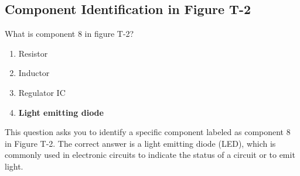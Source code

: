 \subsection{Component Identification in Figure T-2}
\label{T6C07}

\begin{tcolorbox}[colback=gray!10!white,colframe=black!75!black,title=T6C07]
What is component 8 in figure T-2?
\begin{enumerate}[noitemsep]
    \item Resistor
    \item Inductor
    \item Regulator IC
    \item \textbf{Light emitting diode}
\end{enumerate}
\end{tcolorbox}

This question asks you to identify a specific component labeled as component 8 in Figure T-2. The correct answer is a light emitting diode (LED), which is commonly used in electronic circuits to indicate the status of a circuit or to emit light.